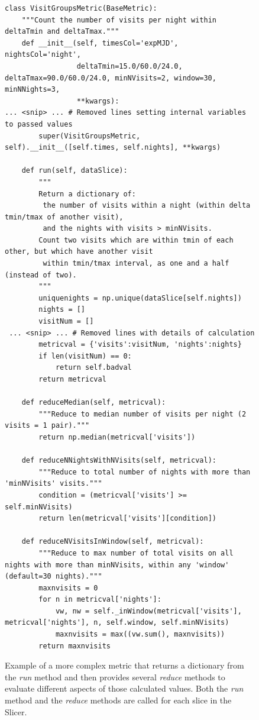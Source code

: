\documentclass[]{spie}  %
\begin{document}
\begin{figure}
\begin{lstlisting}[frame=single]
class VisitGroupsMetric(BaseMetric):
    """Count the number of visits per night within deltaTmin and deltaTmax."""
    def __init__(self, timesCol='expMJD', nightsCol='night', 
                 deltaTmin=15.0/60.0/24.0, deltaTmax=90.0/60.0/24.0, minNVisits=2, window=30, minNNights=3,
                 **kwargs):
... <snip> ... # Removed lines setting internal variables to passed values
        super(VisitGroupsMetric, self).__init__([self.times, self.nights], **kwargs)

    def run(self, dataSlice):
        """
        Return a dictionary of:
         the number of visits within a night (within delta tmin/tmax of another visit),
         and the nights with visits > minNVisits.
        Count two visits which are within tmin of each other, but which have another visit
         within tmin/tmax interval, as one and a half (instead of two).
        """
        uniquenights = np.unique(dataSlice[self.nights])
        nights = []
        visitNum = []
 ... <snip> ... # Removed lines with details of calculation
        metricval = {'visits':visitNum, 'nights':nights}
        if len(visitNum) == 0:
            return self.badval
        return metricval
        
    def reduceMedian(self, metricval):
        """Reduce to median number of visits per night (2 visits = 1 pair)."""
        return np.median(metricval['visits'])
        
    def reduceNNightsWithNVisits(self, metricval):
        """Reduce to total number of nights with more than 'minNVisits' visits."""
        condition = (metricval['visits'] >= self.minNVisits)
        return len(metricval['visits'][condition])

    def reduceNVisitsInWindow(self, metricval):
        """Reduce to max number of total visits on all nights with more than minNVisits, within any 'window' (default=30 nights)."""
        maxnvisits = 0
        for n in metricval['nights']:
            vw, nw = self._inWindow(metricval['visits'], metricval['nights'], n, self.window, self.minNVisits)
            maxnvisits = max((vw.sum(), maxnvisits))
        return maxnvisits
\end{lstlisting}
\caption[]
{\label{fig:visitgroups} Example of a more complex metric that returns
a dictionary from the {\it run} method and then provides several {\it
  reduce} methods to evaluate different aspects of those calculated
values. Both the {\it run} method and the {\it reduce} methods are
called for each slice in the Slicer.}
\end{figure}
\end{document}
